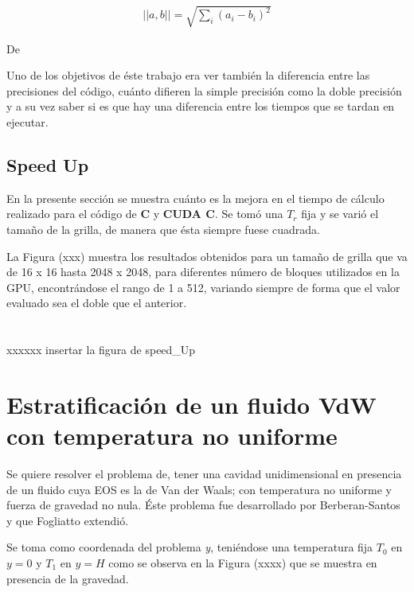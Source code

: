 \begin{align}
	||a,b|| = \sqrt{\sum_i {\left( a_i - b_i \right)}^2  }
\end{align}

De








Uno de los objetivos de éste trabajo era ver también la diferencia entre las precisiones del código, cuánto difieren la simple precisión como la doble precisión y a su vez saber si es que hay una diferencia entre los tiempos que se tardan en ejecutar.

\newpage

\subsection{Speed Up}

En la presente sección se muestra cuánto es la mejora en el tiempo de cálculo realizado para el código de \textbf{C} y \textbf{CUDA C}. Se tomó una $T_r$ fija y se varió el tamaño de la grilla, de manera que ésta siempre fuese cuadrada.

La Figura (xxx) muestra los resultados obtenidos para un tamaño de grilla que va de 16 x 16 hasta 2048 x 2048, para diferentes número de bloques utilizados en la GPU, encontrándose el rango de 1 a 512, variando siempre de forma que el valor evaluado sea el doble que el anterior.
\\
\\
\\
xxxxxx insertar la figura de speed\_Up







\section{Estratificación de un fluido VdW con temperatura no uniforme}

Se quiere resolver el problema de, tener una cavidad unidimensional en presencia de un fluido cuya EOS es la de Van der Waals; con temperatura  no uniforme y fuerza de gravedad no nula. Éste problema fue desarrollado por Berberan-Santos \cite{berberan2002liquid} y que Fogliatto \cite{fogliatto2019simulation} extendió. 

Se toma como coordenada del problema \textit{y}, teniéndose una temperatura fija $T_{0}$ en $y = 0$ y $T_{1}$ en $y = H$ como se observa en la Figura (xxxx) que se muestra en presencia de la gravedad.





